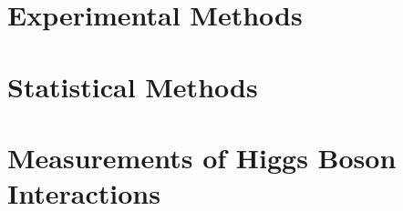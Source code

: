 



\part{Experimental Methods}






\part{Statistical Methods}




\part{Measurements of Higgs Boson Interactions}




\renewcommand{\chaptermark}[1]{\markboth{\MakeUppercase{\hfill \chaptername\ \thechapter.\ #1}}{}}


